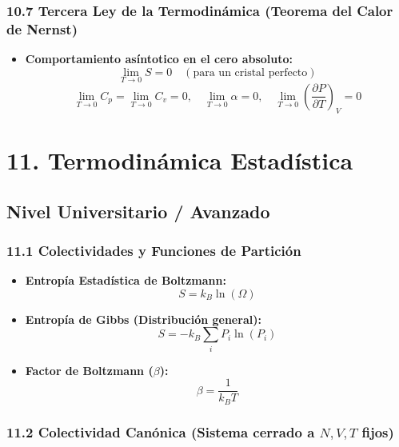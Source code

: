 \documentclass[11pt,a4paper]{article}
\begin{document}
\subsubsection*{10.7 Tercera Ley de la Termodinámica (Teorema del Calor de Nernst)}

\begin{itemize}
  \item \textbf{Comportamiento asíntotico en el cero absoluto:}
  \[
    \lim_{T \to 0} S = 0 \quad (\text{para un cristal perfecto})
  \]
  \[
    \lim_{T \to 0} C_p = \lim_{T \to 0} C_v = 0, \quad \lim_{T \to 0} \alpha = 0, \quad \lim_{T \to 0} \left( \frac{\partial P}{\partial T} \right)_V = 0
  \]
\end{itemize}

\section*{11. Termodinámica Estadística}

\subsection*{Nivel Universitario / Avanzado}

\subsubsection*{11.1 Colectividades y Funciones de Partición}

\begin{itemize}
  \item \textbf{Entropía Estadística de Boltzmann:}
  \[
    S = k_B \ln(\Omega)
  \]
  \item \textbf{Entropía de Gibbs (Distribución general):}
  \[
    S = -k_B \sum_i P_i \ln(P_i)
  \]
  \item \textbf{Factor de Boltzmann ($\beta$):}
  \[
    \beta = \frac{1}{k_B T}
  \]
\end{itemize}

\subsubsection*{11.2 Colectividad Canónica (Sistema cerrado a $N, V, T$ fijos)}
\end{document}
